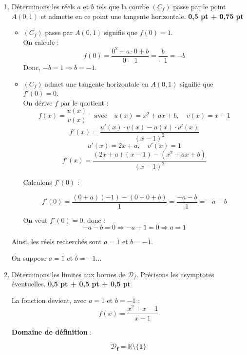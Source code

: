 \documentclass[12pt,a4paper]{article}
\begin{document}
\begin{enumerate}
    \item Déterminons les réels \( a \) et \( b \) tels que la courbe \( (C_f) \) passe par le point \( A(0,1) \) et admette en ce point une tangente horizontale. \hfill \textbf{0{,}5 pt + 0{,}75 pt}

    \begin{itemize}
        \item \( (C_f) \) passe par \( A(0,1) \) signifie que \( f(0) = 1 \).\\

        On calcule :
        \[
        f(0) = \frac{0^2 + a \cdot 0 + b}{0 - 1} = \frac{b}{-1} = -b
        \]
        Donc, \( -b = 1 \Rightarrow \boxed{b = -1} \).

        \item \( (C_f) \) admet une tangente horizontale en \( A(0,1) \) signifie que \( f'(0) = 0 \).\\

        On dérive \( f \) par le quotient :
        \[
        f(x) = \frac{u(x)}{v(x)} \quad \text{avec} \quad u(x) = x^2 + ax + b,\quad v(x) = x - 1
        \]
        \[
        f'(x) = \frac{u'(x) \cdot v(x) - u(x) \cdot v'(x)}{(x - 1)^2}
        \]
        \[
        u'(x) = 2x + a, \quad v'(x) = 1
        \]
        \[
        f'(x) = \frac{(2x + a)(x - 1) - (x^2 + ax + b)}{(x - 1)^2}
        \]

        Calculons \( f'(0) \) :

        \[
        f'(0) = \frac{(0 + a)(-1) - (0 + 0 + b)}{1} = \frac{-a - b}{1} = -a - b
        \]

        On veut \( f'(0) = 0 \), donc :
        \[
        -a - b = 0 \Rightarrow -a + 1 = 0 \Rightarrow \boxed{a = 1}
        \]
    \end{itemize}

    Ainsi, les réels recherchés sont \( \boxed{a = 1} \) et \( \boxed{b = -1} \).

    
    On suppose \( a = 1 \) et \( b = -1 \dots \)
    
    \item Déterminons les limites aux bornes de \( \mathcal{D}_f \). Précisons les asymptotes éventuelles. \hfill \textbf{0{,}5 pt + 0{,}5 pt + 0{,}5 pt}

La fonction devient, avec \( a = 1 \) et \( b = -1 \) :
\[
f(x) = \frac{x^2 + x - 1}{x - 1}
\]

\textbf{Domaine de définition} :

    \begin{resultbox}
    \[
    \mathbf{\mathcal{D}_f = \mathbb{R} \setminus \{1\}}
    \]
		\end{resultbox}


\end{enumerate}
\end{document}
